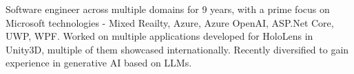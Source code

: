 \documentclass[11pt, a4paper]{awesome-cv}
\begin{document}
\makecvheader[C]


\begin{cvparagraph}

	Software engineer across multiple domains for 9 years, with a prime focus on Microsoft technologies - Mixed Reailty, Azure, Azure OpenAI, ASP.Net Core, UWP, WPF. Worked on multiple applications developed for HoloLens in Unity3D, multiple of them showcased internationally. Recently diversified to gain experience in generative AI based on LLMs.
\end{cvparagraph}
\end{document}
